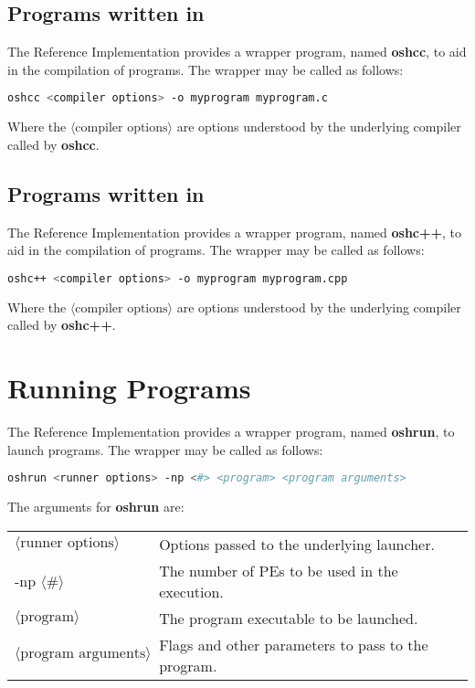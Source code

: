\subsection*{Programs written in \Cstd}

The \openshmem Reference Implementation provides a wrapper program, named
\textbf{oshcc}, to aid in the compilation of \Cstd programs.
The wrapper may be called as follows:

\begin{lstlisting}[language=bash]
oshcc <compiler options> -o myprogram myprogram.c
\end{lstlisting}
Where the $\langle\mbox{compiler options}\rangle$ are options understood by the
underlying \Cstd compiler called by \textbf{oshcc}.


\subsection*{Programs written in \Cpp}

The \openshmem Reference Implementation provides a wrapper program, named
\textbf{oshc++}, to aid in the compilation of \Cpp programs.
The wrapper may be called as follows:

\begin{lstlisting}[language=bash]
oshc++ <compiler options> -o myprogram myprogram.cpp
\end{lstlisting}
Where the $\langle\mbox{compiler options}\rangle$ are options understood by the
underlying \Cpp compiler called by \textbf{oshc++}.


\section{Running Programs}

The \openshmem Reference Implementation provides a wrapper program, named
\textbf{oshrun}, to launch \openshmem programs.
The wrapper may be called as follows:

\begin{lstlisting}[language=bash]
oshrun <runner options> -np <#> <program> <program arguments>
\end{lstlisting}
The arguments for \textbf{oshrun} are:

\begin{tabular}{p{}p{}}
$\langle\mbox{runner options}\rangle$ & {Options passed to the underlying launcher.}\tabularnewline
-np $\langle\mbox{\#}\rangle$ & {The number of \acp{PE} to be used in the execution.}\tabularnewline
$\langle\mbox{program}\rangle$ & {The program executable to be launched.}\tabularnewline
$\langle\mbox{program arguments}\rangle$ & {Flags and other parameters to pass to the program.}\tabularnewline
\end{tabular}




